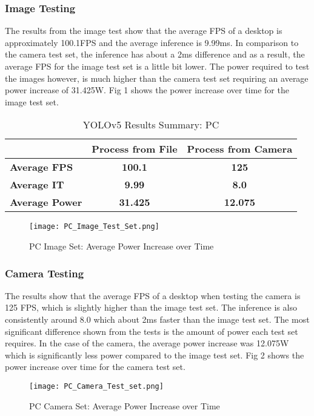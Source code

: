 \documentclass[Report]{IEEEtran}
\begin{document}
\subsubsection{Image Testing}
The results from the image test show that the average FPS of a desktop is approximately 100.1FPS and the average inference is 9.99ms. In comparison to the camera test set, the inference has about a 2ms difference and as a result, the average FPS for the image test set is a little bit lower. The power required to test the images however, is much higher than the camera test set  requiring an average power increase of 31.425W. Fig 1 shows the power increase over time for the image test set.

\begin{table}[]
\centering
\caption{YOLOv5 Results Summary: PC}
\label{}
\begin{tabular}{|l|c|c|}
\hline
\textbf{} & \multicolumn{1}{l|}{\textbf{Process from File}} & \multicolumn{1}{l|}{\textbf{Process from Camera}} \\ \hline
\textbf{Average FPS}   & \textbf{100.1}   & \textbf{125}   \\ \hline
\textbf{Average IT}    & \textbf{9.99} & \textbf{8.0} \\ \hline
\textbf{Average Power} & \textbf{31.425}   & \textbf{12.075}  \\ \hline
\end{tabular}
\end{table}

\begin{figure}[htbp]
\centerline{\texttt{[image: PC\_Image\_Test\_Set.png]}}
\caption{PC Image Set: Average Power Increase over Time}
\label{fig}
\end{figure}

\subsubsection{Camera Testing}
The results show that the average FPS of a desktop when testing the camera is 125 FPS, which is slightly higher than the image test set. The inference is also consistently around 8.0 which about 2ms faster than the image test set. The most significant difference shown from the tests is the amount of power each test set requires. In the case of the camera, the average power increase was 12.075W which is significantly less power compared to the image test set. Fig 2 shows the power increase over time for the camera test set.

\begin{figure}[htbp]
\centerline{\texttt{[image: PC\_Camera\_Test\_set.png]}}
\caption{PC Camera Set: Average Power Increase over Time}
\label{fig}
\end{figure}
\end{document}
